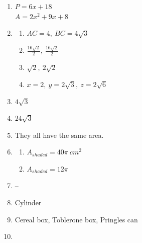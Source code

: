 \documentclass{article}
\begin{document}
\begin{enumerate}
	\begin{enumerate}
	
	\item $V = 800 \ in.^3$
	
	\item $V = 800 \ in.^3$
	
	\item No
	
	\end{enumerate}
	
\item $P = 6x + 18$ \\
	$A = 2x^2 + 9x + 8$
	
\item

	\begin{enumerate}
	
	\item $AC = 4, \ BC = 4\sqrt{3}$
	
	\item $\frac{16\sqrt{2}}{2}, \ \frac{16\sqrt{2}}{2}$
	
	\item $\sqrt{2}, \ 2\sqrt{2}$
	
	\item $x = 2, \ y = 2\sqrt{3}, \ z = 2\sqrt{6}$
	
	\end{enumerate}
	
\item $4\sqrt{3}$

\item $24\sqrt{3}$

\item They all have the same area.

\item

	\begin{enumerate}
	
	\item $A_{shaded} = 40 \pi \ cm^2$
	
	\item $A_{shaded} = 12 \pi$
	
	\end{enumerate}
	
\item --

\item Cylinder

\item Cereal box, Toblerone box, Pringles can

\item


\end{enumerate}
\end{document}
